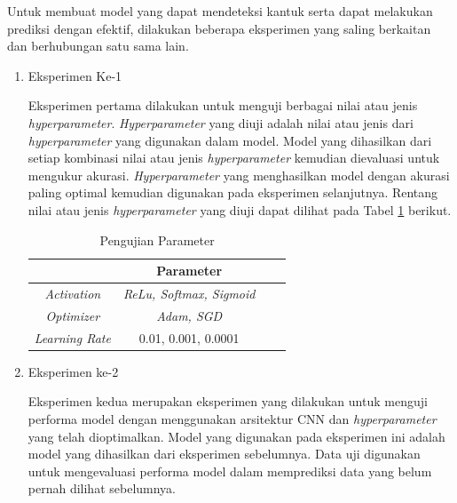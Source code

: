     Untuk membuat model yang dapat mendeteksi kantuk serta dapat melakukan prediksi dengan efektif, dilakukan beberapa eksperimen yang saling berkaitan dan berhubungan satu sama lain.

     \begin{enumerate}
  
        \item Eksperimen Ke-1

        Eksperimen pertama dilakukan untuk menguji berbagai nilai atau jenis \textit{hyperparameter}. \textit{Hyperparameter} yang diuji adalah nilai atau jenis dari \textit{hyperparameter} yang digunakan dalam model. Model yang dihasilkan dari setiap kombinasi nilai atau jenis \textit{hyperparameter} kemudian dievaluasi untuk mengukur akurasi. \textit{Hyperparameter} yang menghasilkan model dengan akurasi paling optimal kemudian digunakan pada eksperimen selanjutnya. Rentang nilai atau jenis \textit{hyperparameter} yang diuji dapat dilihat pada Tabel \ref{Pengujian Parameter} berikut.



            \begin{table}[h]
            \centering
            \caption{Pengujian Parameter}
            \begin{tabular}{cccc}
                \toprule
                \textbf{} & \textbf{Parameter} \\
                \midrule
                      
                          \textit{Activation}  &  \textit{ReLu, Softmax, Sigmoid }\\
                         \textit{Optimizer} &  \textit{Adam, SGD} \\
                          \textit{Learning Rate} &  0.01, 0.001, 0.0001 \\
            
                \bottomrule
            \end{tabular}
            \label{Pengujian Parameter}
        \end{table}
        
        
        \item Eksperimen ke-2

        Eksperimen kedua merupakan eksperimen yang dilakukan untuk menguji performa model dengan menggunakan arsitektur CNN dan \textit{hyperparameter} yang telah dioptimalkan. Model yang digunakan pada eksperimen ini adalah model yang dihasilkan dari eksperimen sebelumnya. Data uji digunakan untuk mengevaluasi performa model dalam memprediksi data yang belum pernah dilihat sebelumnya.

        
       
    \end{enumerate}





